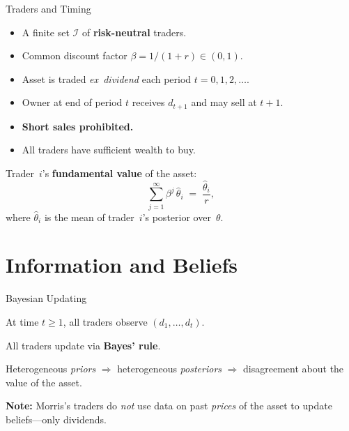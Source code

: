 \documentclass[11pt,aspectratio=169]{beamer}
\begin{document}
\begin{frame}{Traders and Timing}

\begin{itemize}
\item A finite set $\mathcal{I}$ of \textbf{risk-neutral} traders.
\item Common discount factor $\beta = 1/(1+r) \in (0,1)$.
\item Asset is traded \emph{ex~dividend} each period $t=0,1,2,\ldots$.
\item Owner at end of period $t$ receives $d_{t+1}$ and may sell at $t+1$.
\item \textbf{Short sales prohibited.}
\item All traders have sufficient wealth to buy.
\end{itemize}

\medskip

Trader~$i$'s \textbf{fundamental value} of the asset:
\[
  \sum_{j=1}^\infty \beta^j\, \hat\theta_i
  \;=\; \frac{\hat\theta_i}{r},
\]
where $\hat\theta_i$ is the mean of trader~$i$'s posterior over~$\theta$.

\end{frame}


\section{Information and Beliefs}

\begin{frame}{Bayesian Updating}

At time $t\ge 1$, all traders observe $(d_1,\ldots, d_t)$.

\medskip

All traders update via \textbf{Bayes' rule}.

\medskip

Heterogeneous \emph{priors} $\Rightarrow$ heterogeneous
\emph{posteriors} $\Rightarrow$ disagreement about the value of the
asset.

\medskip

\textbf{Note:} Morris's traders do \emph{not} use data on past
\emph{prices} of the asset to update beliefs---only dividends.

\end{frame}
\end{document}
